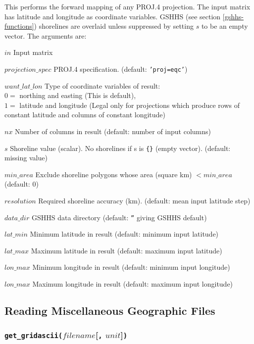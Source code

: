 This performs the forward mapping of any PROJ.4 projection.
The input matrix has latitude and longitude as coordinate variables.
GSHHS (see section \ref{gshhs-functions})
shorelines are overlaid unless suppressed by setting $s$ to be an empty vector.
The arguments are:
\begin{simpleitems}
\item $\mathit{in}$ Input matrix
\item $\mathit{projection\_spec}$ PROJ.4 specification. (default: \texttt{'proj=eqc'})
\item $\mathit{want\_lat\_lon}$ Type of coordinate variables of result: \\
    $0=$ northing and easting (This is default), \\
    $1=$ latitude and longitude (Legal only for projections which produce
    rows of constant latitude and columns of constant longitude)
\item $\mathit{nx}$ Number of columns in result (default: number of input columns)
\item $\mathit{s}$ Shoreline value (scalar). No shorelines if s is \texttt{\{\}} (empty vector).
    (default: missing value)
\item $\mathit{min\_area}$ Exclude shoreline polygons whose area (square km)
$< \mathit{min\_area}$ (default: 0)
\item $\mathit{resolution}$ Required shoreline accuracy (km). (default: mean input latitude step)
\item $\mathit{data\_dir}$ GSHHS data directory (default: \texttt{''} giving GSHHS default)
\item $\mathit{lat\_min}$ Minimum latitude in result (default: minimum input latitude)
\item $\mathit{lat\_max}$ Maximum latitude in result (default: maximum input latitude)
\item $\mathit{lon\_max}$ Minimum longitude in result (default: minimum input longitude)
\item $\mathit{lon\_max}$ Maximum longitude in result (default: maximum input longitude)
\end{simpleitems}

\subsection{Reading Miscellaneous Geographic Files}
    \label{geog-Reading}

\subsubsection{\texttt{get\_gridascii(}$\mathit{filename}$[\texttt{,} $\mathit{unit}$]\texttt{)}}
    \label{geog-get-gridascii}

